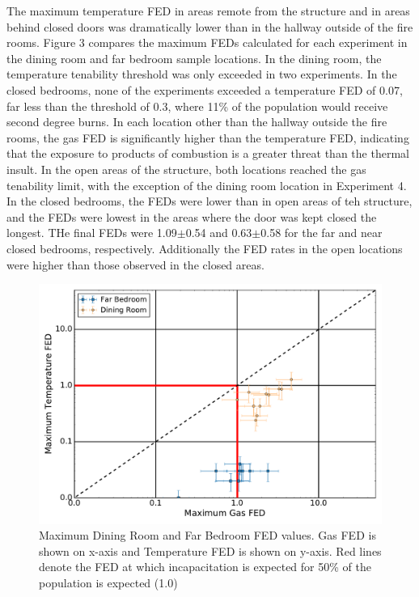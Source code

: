 \documentclass[12pt,oneside]{article}
\begin{document}
The maximum temperature FED in areas remote from the structure and in areas behind closed doors was dramatically lower than in the hallway outside of the fire rooms. Figure 3 compares the maximum FEDs calculated for each experiment in the dining room and far bedroom sample locations. In the dining room, the temperature tenability threshold was only exceeded in two experiments. In the closed bedrooms, none of the experiments exceeded a temperature FED of 0.07, far less than the threshold of 0.3, where 11\% of the population would receive second degree burns. In each  location other than the hallway outside the fire rooms, the gas FED is significantly higher than the temperature FED, indicating that the exposure to products of combustion is a greater threat than the thermal insult. In the open areas of the structure, both locations reached the gas tenability limit, with the exception of the dining room location in Experiment 4. In the closed bedrooms, the FEDs were lower than in open areas of teh structure, and the FEDs were lowest in the areas where the door was kept closed the longest. THe final FEDs were 1.09$\pm$0.54 and 0.63$\pm$0.58 for the far and near closed bedrooms, respectively. Additionally the FED rates in the open locations were higher than those observed in the closed areas.

\begin{figure}[!ht]
	\centering
	\includegraphics[width=.75\textwidth]{../Figures/br_compare/Far}
	\caption[Maximum Dining Room and Far Bedroom FED values]{Maximum Dining Room and Far Bedroom FED values. Gas FED is shown on x-axis and Temperature FED is shown on y-axis. Red lines denote the FED at which incapacitation is expected for 50\% of the population is expected (1.0)}
	\label{fig:far_FED_compare}
\end{figure}

\end{document}
